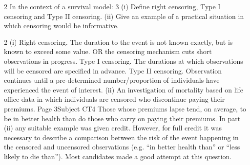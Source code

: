 \documentclass[a4paper,12pt]{article}
\begin{document}
2 In the context of a survival model:
3
(i) Define right censoring, Type I censoring and Type II censoring.
(ii) Give an example of a practical situation in which censoring would be
informative.



2
(i)
Right censoring. The duration to the event is not known exactly,
but is known to exceed some value.
OR
the censoring mechanism cuts short observations in progress.
Type I censoring. The durations at which observations will be censored are specified
in advance.
Type II censoring. Observation continues until a pre-determined number/proportion
of individuals have experienced the event of interest.
(ii)
An investigation of mortality based on life office data in which
individuals are censored who discontinue paying their premiums.
Page 3Subject CT4 %
Those whose premiums lapse tend, on average, to be in better health
than do those who carry on paying their premiums.
In part (ii) any suitable example was given credit. However, for full credit it was necessary
to describe a comparison between the risk of the event happening in the censored and
uncensored observations (e.g. “in better health than” or “less likely to die than”). Most
candidates made a good attempt at this question.
\end{document}
